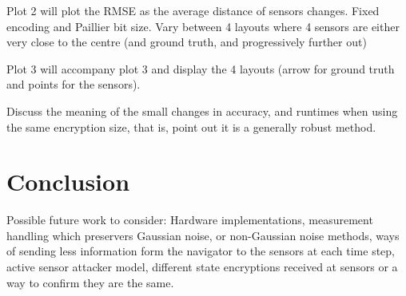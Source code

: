 \documentclass[twocolumn]{autart}
\begin{document}
Plot 2 will plot the RMSE as the average distance of sensors changes. Fixed encoding and Paillier bit size. Vary between 4 layouts where 4 sensors are either very close to the centre (and ground truth, and progressively further out)

Plot 3 will accompany plot 3 and display the 4 layouts (arrow for ground truth and points for the sensors).

Discuss the meaning of the small changes in accuracy, and runtimes when using the same encryption size, that is, point out it is a generally robust method.

% 
%                                       
%                                       
%                                       
% 

\section{Conclusion} \label{sec:conclusion}
Possible future work to consider: Hardware implementations, measurement handling which preservers Gaussian noise, or non-Gaussian noise methods, ways of sending less information form the navigator to the sensors at each time step, active sensor attacker model, different state encryptions received at sensors or a way to confirm they are the same.



\end{document}
